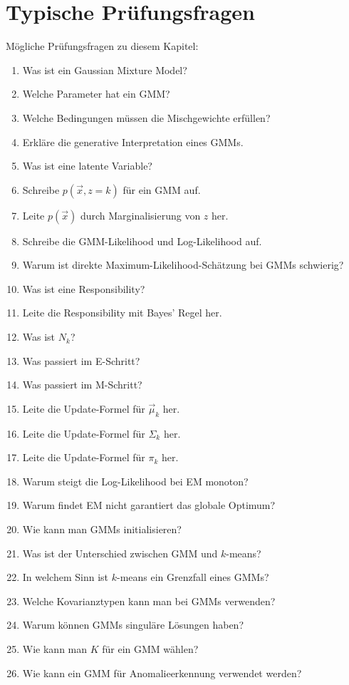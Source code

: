 \section{Typische Prüfungsfragen}

\begin{examtipbox}
Mögliche Prüfungsfragen zu diesem Kapitel:

\begin{enumerate}
    \item Was ist ein Gaussian Mixture Model?
    \item Welche Parameter hat ein GMM?
    \item Welche Bedingungen müssen die Mischgewichte erfüllen?
    \item Erkläre die generative Interpretation eines GMMs.
    \item Was ist eine latente Variable?
    \item Schreibe \(p(\vec{x},z=k)\) für ein GMM auf.
    \item Leite \(p(\vec{x})\) durch Marginalisierung von \(z\) her.
    \item Schreibe die GMM-Likelihood und Log-Likelihood auf.
    \item Warum ist direkte Maximum-Likelihood-Schätzung bei GMMs schwierig?
    \item Was ist eine Responsibility?
    \item Leite die Responsibility mit Bayes' Regel her.
    \item Was ist \(N_k\)?
    \item Was passiert im E-Schritt?
    \item Was passiert im M-Schritt?
    \item Leite die Update-Formel für \(\vec{\mu}_k\) her.
    \item Leite die Update-Formel für \(\Sigma_k\) her.
    \item Leite die Update-Formel für \(\pi_k\) her.
    \item Warum steigt die Log-Likelihood bei EM monoton?
    \item Warum findet EM nicht garantiert das globale Optimum?
    \item Wie kann man GMMs initialisieren?
    \item Was ist der Unterschied zwischen GMM und \(k\)-means?
    \item In welchem Sinn ist \(k\)-means ein Grenzfall eines GMMs?
    \item Welche Kovarianztypen kann man bei GMMs verwenden?
    \item Warum können GMMs singuläre Lösungen haben?
    \item Wie kann man \(K\) für ein GMM wählen?
    \item Wie kann ein GMM für Anomalieerkennung verwendet werden?
\end{enumerate}
\end{examtipbox}